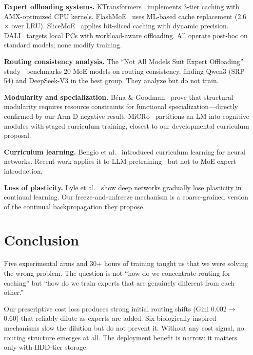 \documentclass{article}
\begin{document}
\textbf{Expert offloading systems.} KTransformers~\cite{ktransformers2025} implements 3-tier caching with AMX-optimized CPU kernels. FlashMoE~\cite{flashmoe2026} uses ML-based cache replacement (2.6$\times$ over LRU). SliceMoE~\cite{slicemoe2026} applies bit-sliced caching with dynamic precision. DALI~\cite{dali2026} targets local PCs with workload-aware offloading. All operate post-hoc on standard models; none modify training.

\textbf{Routing consistency analysis.} The ``Not All Models Suit Expert Offloading'' study~\cite{notallmodels2025} benchmarks 20 MoE models on routing consistency, finding Qwen3 (SRP 54) and DeepSeek-V3 in the best group. They analyze but do not train.

\textbf{Modularity and specialization.} Béna \& Goodman~\cite{bena2025modularity} prove that structural modularity requires resource constraints for functional specialization---directly confirmed by our Arm D negative result. MiCRo~\cite{micro2025} partitions an LM into cognitive modules with staged curriculum training, closest to our developmental curriculum proposal.

\textbf{Curriculum learning.} Bengio et al.~\cite{bengio2009curriculum} introduced curriculum learning for neural networks. Recent work applies it to LLM pretraining~\cite{curriculum_llm2025} but not to MoE expert introduction.

\textbf{Loss of plasticity.} Lyle et al.~\cite{plasticity2024nature} show deep networks gradually lose plasticity in continual learning. Our freeze-and-unfreeze mechanism is a coarse-grained version of the continual backpropagation they propose.

\section{Conclusion}

Five experimental arms and 30+ hours of training taught us that we were solving the wrong problem. The question is not ``how do we concentrate routing for caching'' but ``how do we train experts that are genuinely different from each other.''

Our prescriptive cost loss produces strong initial routing shifts (Gini 0.002$\to$0.60) that reliably dilute as experts are added. Six biologically-inspired mechanisms slow the dilution but do not prevent it. Without any cost signal, no routing structure emerges at all. The deployment benefit is narrow: it matters only with HDD-tier storage.
\end{document}
